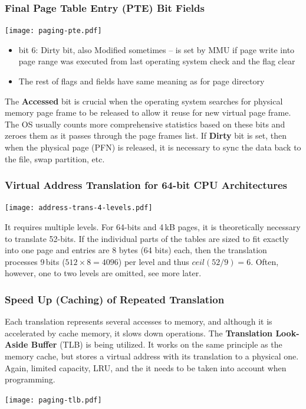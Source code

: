 \documentclass{beamer}
\begin{document}
\begin{frame}
\frametitle{Final \textbf{Page Table Entry} (PTE) Bit Fields}

{
\centering

\texttt{[image: paging-pte.pdf]}

}

\vskip 2mm

\begin{itemize}
\item bit 6: Dirty bit, also Modified sometimes – is set by MMU if page write into page range was executed from last operating system check and the flag clear
\item The rest of flags and fields have same meaning as for page directory
\end{itemize}

\smallskip

The \textbf{Accessed} bit is crucial when the operating system searches for physical memory page frame to be released to allow it reuse for new virtual page frame.
The OS usually counts more comprehensive statistics based on these bits and zeroes them as it passes through the page frames list.
If \textbf{Dirty} bit is set, then when the physical page (PFN) is released, it is necessary to
sync the data back to the file, swap partition, etc.

\end{frame}


\begin{frame}
\frametitle{Virtual Address Translation for 64-bit CPU Architectures}

{
\centering

\texttt{[image: address-trans-4-levels.pdf]}

}

It requires multiple levels. For 64-bits and 4\,kB pages, it is theoretically
necessary to translate 52-bits. If the individual parts of the tables are sized to
fit exactly into one page and entries are 8 bytes (64 bits) each, then the translation processes 9\,bits ($512 \times 8 = 4096$) per level and thus $ceil(52 / 9) = 6$. Often, however, one to two levels are omitted, see more later.

\end{frame}

\begin{frame}
\frametitle{Speed Up (Caching) of Repeated Translation}

Each translation represents several accesses to memory, and although it is accelerated
by cache memory, it slows down operations. The \textbf{Translation Look-Aside Buffer} (TLB) is being utilized.
It works on the same principle as the memory cache, but stores a virtual address
with its translation to a physical one. Again, limited capacity, LRU, and the it needs to be taken
into account when programming.

\vskip 2mm

{
\centering

\texttt{[image: paging-tlb.pdf]}

}
\end{frame}
\end{document}
